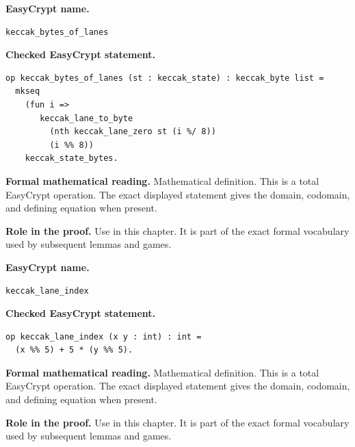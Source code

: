 \begin{formaldefinition}
\noindent\textbf{EasyCrypt name.}
\begin{lstlisting}[language=EasyCrypt,basicstyle=\ttfamily\scriptsize]
keccak_bytes_of_lanes
\end{lstlisting}
\noindent\textbf{Checked EasyCrypt statement.}
\begin{lstlisting}[language=EasyCrypt,basicstyle=\ttfamily\scriptsize]
op keccak_bytes_of_lanes (st : keccak_state) : keccak_byte list =
  mkseq
    (fun i =>
       keccak_lane_to_byte
         (nth keccak_lane_zero st (i %/ 8))
         (i %% 8))
    keccak_state_bytes.
\end{lstlisting}
\noindent\textbf{Formal mathematical reading.}
Mathematical definition. This is a total EasyCrypt operation.  The exact displayed statement gives the domain, codomain, and defining equation when present.

\noindent\textbf{Role in the proof.}
Use in this chapter. It is part of the exact formal vocabulary used by subsequent lemmas and games.

\end{formaldefinition}

\begin{formaldefinition}
\noindent\textbf{EasyCrypt name.}
\begin{lstlisting}[language=EasyCrypt,basicstyle=\ttfamily\scriptsize]
keccak_lane_index
\end{lstlisting}
\noindent\textbf{Checked EasyCrypt statement.}
\begin{lstlisting}[language=EasyCrypt,basicstyle=\ttfamily\scriptsize]
op keccak_lane_index (x y : int) : int =
  (x %% 5) + 5 * (y %% 5).
\end{lstlisting}
\noindent\textbf{Formal mathematical reading.}
Mathematical definition. This is a total EasyCrypt operation.  The exact displayed statement gives the domain, codomain, and defining equation when present.

\noindent\textbf{Role in the proof.}
Use in this chapter. It is part of the exact formal vocabulary used by subsequent lemmas and games.

\end{formaldefinition}

